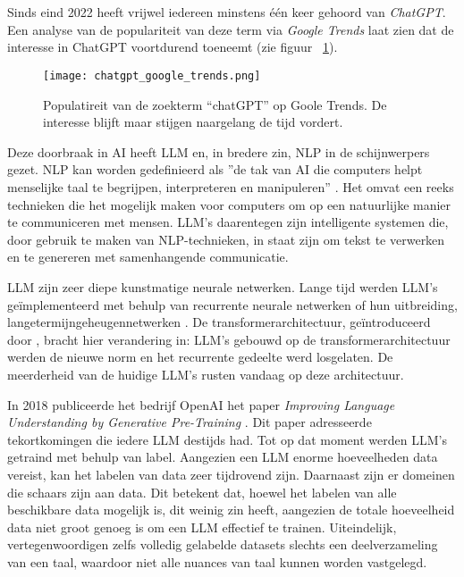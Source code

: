 \section{}%
\label{sec:llms}

Sinds eind 2022 heeft vrijwel iedereen minstens één keer gehoord van \textit{\gls{ChatGPT}}. Een analyse van de populariteit van deze term via \textit{Google Trends} laat zien dat de interesse in \gls{ChatGPT} voortdurend toeneemt (zie figuur ~\ref{fig:chatgpt_google_trends}). 

\begin{figure}
    \centering
    \texttt{[image: chatgpt\_google\_trends.png]}
    \caption[Populariteit van de zoekterm ``chatGPT'']{\label{fig:chatgpt_google_trends}Populatireit van de zoekterm ``chatGPT'' op Goole Trends. De interesse blijft maar stijgen naargelang de tijd vordert.}
\end{figure}

Deze doorbraak in \acrlong{AI} heeft \acrfull{LLM} en, in bredere zin, \acrfull{NLP} in de schijnwerpers gezet. \acrshort{NLP} kan worden gedefinieerd als ''de tak van \acrlong{AI} die computers helpt menselijke taal te begrijpen, interpreteren en manipuleren'' \autocite{Zohuri2022}. Het omvat een reeks technieken die het mogelijk maken voor computers om op een natuurlijke manier te communiceren met mensen. \acrshort{LLM}'s daarentegen zijn intelligente systemen die, door gebruik te maken van \acrshort{NLP}-technieken, in staat zijn om tekst te verwerken en te genereren met samenhangende communicatie. 

\acrlong{LLM} zijn zeer diepe kunstmatige neurale netwerken. Lange tijd werden \acrshort{LLM}'s geïmplementeerd met behulp van recurrente neurale netwerken of hun uitbreiding, langetermijngeheugennetwerken \autocite{Delobelle2020}. De transformerarchitectuur, geïntroduceerd door \textcite{Vaswani2017}, bracht hier verandering in: \acrshort{LLM}'s gebouwd op de transformerarchitectuur werden de nieuwe norm en het recurrente gedeelte werd losgelaten. De meerderheid van de huidige \acrshort{LLM}'s rusten vandaag op deze architectuur.

In 2018 publiceerde het bedrijf OpenAI het paper \textit{Improving Language Understanding by Generative Pre-Training} \autocite{Radford2018}. Dit paper adresseerde tekortkomingen die iedere \acrshort{LLM} destijds had. Tot op dat moment werden \acrshort{LLM}'s getraind met behulp van \gls{label}. Aangezien een \acrshort{LLM} enorme hoeveelheden data vereist, kan het labelen van data zeer tijdrovend zijn. Daarnaast zijn er domeinen die schaars zijn aan data. Dit betekent dat, hoewel het labelen van alle beschikbare data mogelijk is, dit weinig zin heeft, aangezien de totale hoeveelheid data niet groot genoeg is om een \acrshort{LLM} effectief te trainen. Uiteindelijk, vertegenwoordigen zelfs volledig gelabelde datasets slechts een deelverzameling van een taal, waardoor niet alle nuances van taal kunnen worden vastgelegd.

